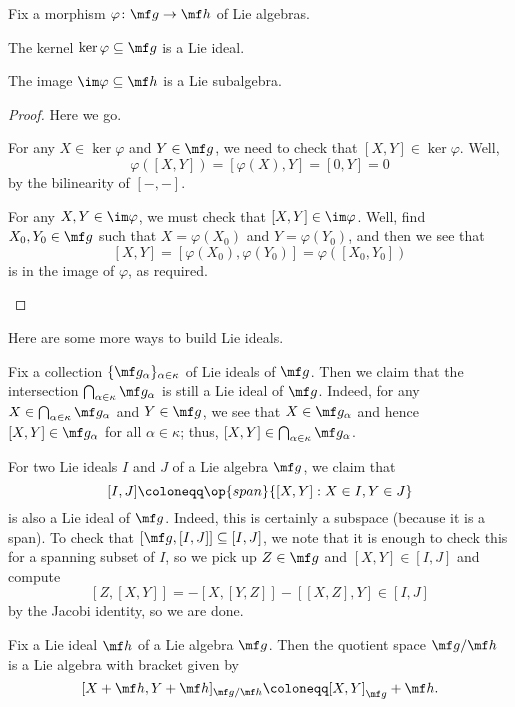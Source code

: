 \documentclass[../notes.tex]{subfiles}
\begin{document}
\begin{lemma} \label{lem:subalgebra-checks}
	Fix a morphism $\varphi\colon\mf g\to\mf h$ of Lie algebras.
	\begin{listalph}
		\item The kernel $\ker\varphi\subseteq\mf g$ is a Lie ideal.
		\item The image $\im\varphi\subseteq\mf h$ is a Lie subalgebra.
	\end{listalph}
\end{lemma}
\begin{proof}
	Here we go.
	\begin{listalph}
		\item For any $X\in\ker\varphi$ and $Y\in\mf g$, we need to check that $[X,Y]\in\ker\varphi$. Well,
		\[\varphi([X,Y])=[\varphi(X),Y]=[0,Y]=0\]
		by the bilinearity of $[-,-]$.
		\item For any $X,Y\in\im\varphi$, we must check that $[X,Y]\in\im\varphi$. Well, find $X_0,Y_0\in\mf g$ such that $X=\varphi(X_0)$ and $Y=\varphi(Y_0)$, and then we see that
		\[[X,Y]=[\varphi(X_0),\varphi(Y_0)]=\varphi([X_0,Y_0])\]
		is in the image of $\varphi$, as required.
		\qedhere
	\end{listalph}
\end{proof}
Here are some more ways to build Lie ideals.
\begin{remark} \label{rem:intersect-lie-ideals}
	Fix a collection $\{\mf g_\alpha\}_{\alpha\in\kappa}$ of Lie ideals of $\mf g$. Then we claim that the intersection $\bigcap_{\alpha\in\kappa}\mf g_\alpha$ is still a Lie ideal of $\mf g$. Indeed, for any $X\in\bigcap_{\alpha\in\kappa}\mf g_\alpha$ and $Y\in\mf g$, we see that $X\in\mf g_\alpha$ and hence $[X,Y]\in\mf g_\alpha$ for all $\alpha\in\kappa$; thus, $[X,Y]\in\bigcap_{\alpha\in\kappa}\mf g_\alpha$.
\end{remark}
\begin{remark}
	For two Lie ideals $I$ and $J$ of a Lie algebra $\mf g$, we claim that
	\[[I,J]\coloneqq\op{span}\{[X,Y]:X\in I,Y\in J\}\]
	is also a Lie ideal of $\mf g$. Indeed, this is certainly a subspace (because it is a span). To check that $[\mf g,[I,J]]\subseteq [I,J]$, we note that it is enough to check this for a spanning subset of $I$, so we pick up $Z\in\mf g$ and $[X,Y]\in[I,J]$ and compute
	\[[Z,[X,Y]]=-[X,[Y,Z]]-[[X,Z],Y]\in[I,J]\]
	by the Jacobi identity, so we are done.
\end{remark}
\begin{lemma}
	Fix a Lie ideal $\mf h$ of a Lie algebra $\mf g$. Then the quotient space $\mf g/\mf h$ is a Lie algebra with bracket given by
	\[[X+\mf h,Y+\mf h]_{\mf g/\mf h}\coloneqq[X,Y]_{\mf g}+\mf h.\]
\end{lemma}
\end{document}
